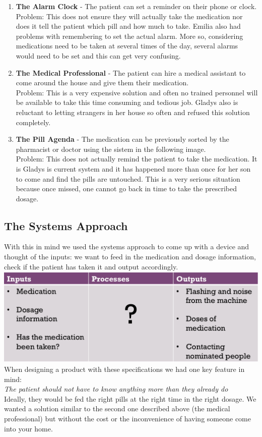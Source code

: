 \documentclass[12pt]{article}
\begin{document}
	\begin{enumerate}
	\item \textbf{The Alarm Clock} - The patient can set a reminder on their phone or clock. \\ Problem: This does not ensure they will actually take the medication nor does it tell the patient which pill and how much to take. Emilia also had problems with remembering to set the actual alarm. More so, considering medications need to be taken at several times of the day, several alarms would need to be set and this can get very confusing.
	\item \textbf{The Medical Professional} - The patient can hire a medical assistant to come around the house and give them their medication. \\ Problem: This is a very expensive solution and often no trained personnel will be available to take this time consuming and tedious job. Gladys also is reluctant to letting strangers in her house so often and refused this solution completely.
	\item \textbf{The Pill Agenda} - The medication can be previously sorted by the pharmacist or doctor using the sistem in the following image. \\ Problem: This does not actually remind the patient to take the medication. It is Gladys is current system and it has happened more than once for her son to come and find the pills are untouched. This is a very serious situation because once missed, one cannot go back in time to take the prescribed dosage.
	\end{enumerate}

	\subsection{The Systems Approach}
	With this in mind we used the systems approach to come up with a device and thought of the inputs: we want to feed in the medication and dosage information, check if the patient has taken it and output accordingly. \\
	\includegraphics[width=\textwidth]{systems.png}
	When designing a product with these specifications we had one key feature in mind: \\ \emph{The patient should not have to know anything more than they already do} \\ Ideally, they would be fed the right pills at the right time in the right dosage. We wanted a solution similar to the second one described above (the medical professional) but without the cost or the inconvenience of having someone come into your home.\medskip\\
\end{document}
